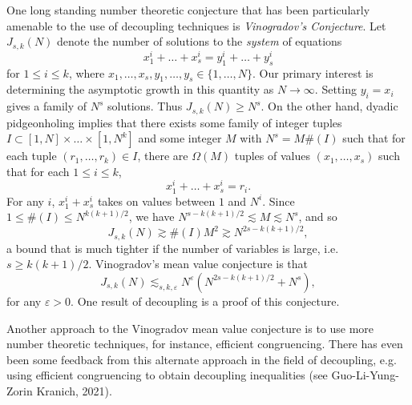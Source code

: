 One long standing number theoretic conjecture that has been particularly amenable to the use of decoupling techniques is \emph{Vinogradov's Conjecture}. Let $J_{s,k}(N)$ denote the number of solutions to the \emph{system} of equations
%
\[ x_1^i + \dots + x_s^i = y_1^i + \dots + y_s^i \]
%
for $1 \leq i \leq k$, where $x_1,\dots,x_s,y_1,\dots,y_s \in \{ 1, \dots, N \}$. Our primary interest is determining the asymptotic growth in this quantity as $N \to \infty$. Setting $y_i = x_i$ gives a family of $N^s$ solutions. Thus $J_{s,k}(N) \geq N^s$. On the other hand, dyadic pidgeonholing implies that there exists some family of integer tuples $I \subset [1,N] \times \dots \times [1,N^k]$ and some integer $M$ with $N^s = M \#(I)$ such that for each tuple $(r_1,\dots,r_k) \in I$, there are $\Omega(M)$ tuples of values $(x_1,\dots,x_s)$ such that for each $1 \leq i \leq k$,
%
\[ x_1^i + \dots + x_s^i = r_i. \]
%
For any $i$, $x_1^i + x_s^i$ takes on values between $1$ and $N^i$. Since $1 \leq \#(I) \leq N^{k(k+1)/2}$, we have $N^{s - k(k+1)/2} \lesssim M \lesssim N^s$, and so
%
\[ J_{s,k}(N) \gtrsim \#(I) M^2 \gtrsim N^{2s - k(k+1)/2}, \]
%
a bound that is much tighter if the number of variables is large, i.e. $s \geq k(k+1)/2$. Vinogradov's mean value conjecture is that
%
\[ J_{s,k}(N) \lesssim_{s,k,\varepsilon} N^\varepsilon ( N^{2s-k(k+1)/2} + N^s ), \]
%
for any $\varepsilon > 0$. One result of decoupling is a proof of this conjecture.

\begin{remark}
  Another approach to the Vinogradov mean value conjecture is to use more number theoretic techniques, for instance, efficient congruencing. There has even been some feedback from this alternate approach in the field of decoupling, e.g. using efficient congruencing to obtain decoupling inequalities (see Guo-Li-Yung-Zorin Kranich, 2021).
\end{remark}

